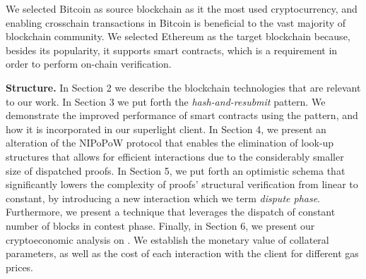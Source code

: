 We selected Bitcoin as source blockchain as it the most used cryptocurrency,
and enabling crosschain transactions in Bitcoin is beneficial to the vast
majority of blockchain community. We selected Ethereum as the target blockchain
because, besides its popularity, it supports smart contracts, which is a
requirement in order to perform on-chain verification.
\noindent

\textbf{Structure.} In Section 2 we describe the blockchain technologies that
are relevant to our work. In Section 3 we put forth the
\emph{hash-and-resubmit} pattern. We demonstrate the improved performance of
smart contracts using the pattern, and how it is incorporated in our superlight
client. In Section 4, we present an alteration of the NIPoPoW protocol that
enables the elimination of look-up structures that allows for efficient
interactions due to the considerably smaller size of dispatched proofs. In
Section 5, we put forth an optimistic schema that significantly lowers the
complexity of proofs' structural verification from linear to constant, by
introducing a new interaction which we term \emph{dispute phase}. Furthermore,
we present a technique that leverages the dispatch of constant number of blocks
in contest phase. Finally, in Section 6, we present our cryptoeconomic analysis
on \name. We establish the monetary value of collateral parameters, as well
as the cost of each interaction with the client for different gas prices.
